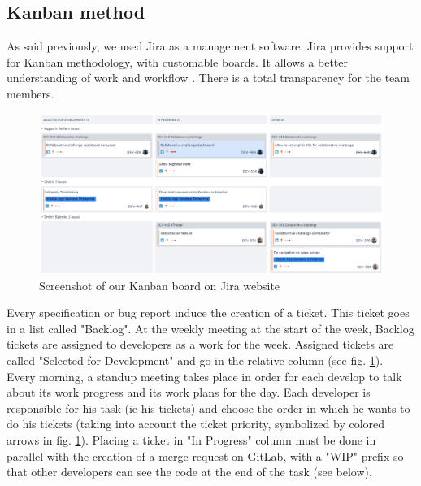 \documentclass{article}
\begin{document}
            \subsection{Kanban method}
                As said previously, we used Jira as a management software. Jira provides support for Kanban methodology,
                with customable boards. It allows a better understanding of work and workflow \cite{kanban}.
                There is a total transparency for the team members.
                \begin{figure}[H]
                    \includegraphics[width=\textwidth]{kanban.png}
                    \caption{Screenshot of our Kanban board on Jira website}
                    \label{fig:kanban}
                \end{figure}
                Every specification or bug report induce the creation of a ticket. This ticket goes in a list called "Backlog".
                At the weekly meeting at the start of the week, Backlog tickets are assigned to developers as a work for the week.
                Assigned tickets are called "Selected for Development" and go in the relative column (see fig. \ref{fig:kanban}).\\
                Every morning, a standup meeting takes place in order for each develop to talk about its work progress and its work plans for the day.
                Each developer is responsible for his task (ie his tickets) and choose the order in which he wants to do his tickets
                (taking into account the ticket priority, symbolized by colored arrows in fig. \ref{fig:kanban}).
                Placing a ticket in "In Progress" column must be done in parallel with the creation of a merge request on GitLab,
                with a "WIP" prefix so that other developers can see the code at the end of the task (see below).
\end{document}
